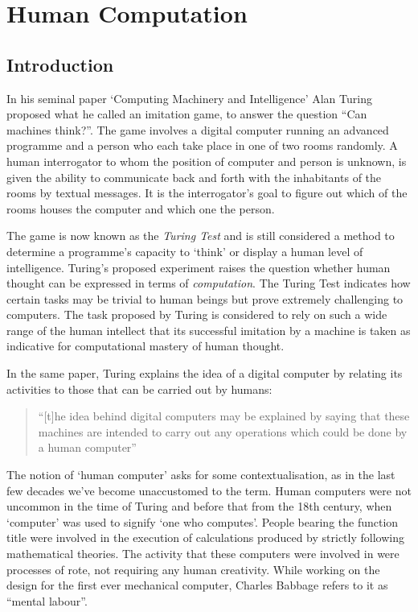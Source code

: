 \chapter{Human Computation}
\label{ch:human_computation}

\section{Introduction} %
\label{sec:introduction}



In his seminal paper `Computing Machinery and Intelligence' Alan Turing proposed what he called an imitation game, to answer the question ``Can machines think?''\cite{Turing:1950wi}. The game involves a digital computer running an advanced programme and a person who each take place in one of two rooms randomly. A human interrogator to whom the position of computer and person is unknown, is given the ability to communicate back and forth with the inhabitants of the rooms by textual messages. It is the interrogator's goal to figure out which of the rooms houses the computer and which one the person.

The game is now known as the \emph{Turing Test} and is still considered a method to determine a programme's capacity to `think' or display a human level of intelligence. Turing's proposed experiment raises the question whether human thought can be expressed in terms of \emph{computation}. The Turing Test indicates how certain tasks may be trivial to human beings but prove extremely challenging to computers. The task proposed by Turing is considered to rely on such a wide range  of the human intellect that its successful imitation by a machine is taken as indicative for computational mastery of human thought.

In the same paper, Turing explains the idea of a digital computer by relating its activities to those that can be carried out by humans:

\begin{quote}
  ``[t]he idea behind digital computers may be explained by saying that these machines are intended to carry out any operations which could be done by a human computer''\cite{Turing:1950wi}
\end{quote}

The notion of `human computer' asks for some contextualisation, as in the last few decades we've become unaccustomed to the term. Human computers were not uncommon in the time of Turing and before that from the 18th century, when `computer' was used to signify `one who computes'\cite{grier2007computers}. People bearing the function title were involved in the execution of calculations produced by strictly following mathematical theories. The activity that these computers were involved in were processes of rote, not requiring any human creativity. While working on the design for the first ever mechanical computer, Charles Babbage refers to it as ``mental labour''\cite[Ch.\ 20]{Babbage:1832vu}.

